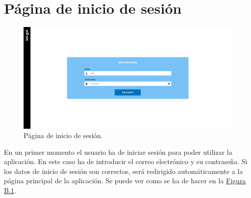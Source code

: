 \section{Página de inicio de sesión}
\label{PInicioSesion}

\begin{figure}[H]
\centerline{\includegraphics[width=15cm]{figuras/manualUsuario/InicioSesion.PNG}}
\caption{Página de inicio de sesión.}
\label{enlacePInicioSesion}
\end{figure}

En un primer momento el usuario ha de iniciar sesión para poder utilizar la aplicación. En este caso ha de introducir el correo electrónico y su contraseña. Si los datos de inicio de sesión son correctos, será redirigido automáticamente a la página principal de la aplicación. Se puede ver como se ha de hacer en la \hyperref[enlacePInicioSesion]{Figura B.1}.